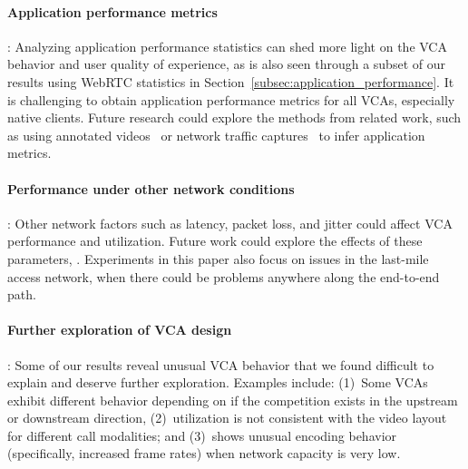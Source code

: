 \paragraph{Application performance metrics}: Analyzing application performance
statistics can shed more light on the VCA behavior and user quality of
experience, as is also seen through a subset of our results using WebRTC
statistics in Section~\ref{subsec:application_performance}. It is challenging
to obtain application performance metrics for all VCAs, especially native
clients. Future research could explore the methods from related work, such as
using annotated videos~\cite{xu2012video} or network traffic
captures~\cite{dasari2018scalable} to infer application metrics.

\paragraph{Performance under other network conditions}: Other network factors
such as latency, packet loss, and jitter could affect VCA performance and
utilization.  Future work could explore the effects of these parameters,
  .
Experiments in this paper also focus on issues in the last-mile access
network, when there could be problems anywhere along the end-to-end path.

\paragraph{Further exploration of VCA design}: Some of our results reveal
unusual VCA behavior that we found difficult to explain and deserve further
exploration. Examples include: (1)~Some VCAs exhibit different behavior
depending on if the competition exists in the upstream or downstream
direction, (2)~\teams utilization is not consistent with the video layout for
different call modalities; and (3)~\meet shows unusual encoding behavior
(specifically, increased frame rates) when network capacity is very low.
